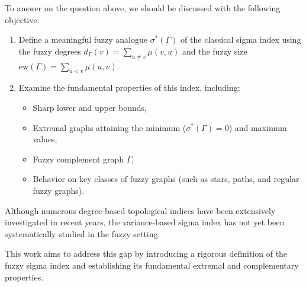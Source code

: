 \documentclass[12pt]{amsart}
\newcommand{\ew}{\mathrm{ew}}
\newcommand{\SFG}{\sigma^*(\Gamma)}
\newcommand{\OG}{\overline{\Gamma}}
\begin{document}
To answer on the question above, we should be discussed with the following objective:
\begin{enumerate}
\item Define a meaningful fuzzy analogue $\SFG$ of the classical sigma index using the fuzzy degrees
$d_\Gamma(v) = \sum_{u \neq v} \mu(v,u)$ and the fuzzy size $\ew(\Gamma)= \sum_{u < v} \mu(u,v)$.
    
\item Examine the fundamental properties of this index, including:
    \begin{itemize}
        \item Sharp lower and upper bounds,
        \item Extremal graphs attaining the minimum ($\SFG= 0$) and maximum values,
        \item Fuzzy complement graph $\OG$,
        \item Behavior on key classes of fuzzy graphs (such as stars, paths, and regular fuzzy graphs).
    \end{itemize}
\end{enumerate}

Although numerous degree-based topological indices have been extensively investigated in recent years, the variance-based sigma index has not yet been systematically studied in the fuzzy setting.

This work aims to address this gap by introducing a rigorous definition of the fuzzy sigma index and establishing its fundamental extremal and complementary properties.


\end{document}
